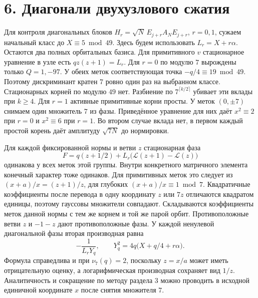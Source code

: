 \documentclass[11pt,a4paper]{article}
\newcommand{\sect}[1]{\section*{\sffamily\color{ink}#1}}
\begin{document}
\newpage
\sect{6. Диагонали двухузлового сжатия}
Для контроля диагональных блоков \(H_r=\sqrt N\,E_{j+r}A_NE_{j+r}\), \(r=0,1\), сужаем начальный класс до \(X\equiv5\bmod49\). Здесь будем использовать \(L_r=X+r\alpha\). Остаются два полных орбитальных базиса. Для примитивного \(v\) стационарное уравнение в узле есть \(qz(z+1)=L_r\). Для \(r=0\) по модулю \(7\) вырождены только \(Q=1,-97\). У обеих меток соответствующая точка \(-q/4\equiv19\bmod49\). Поэтому дискриминант кратен \(7\) ровно один раз на выбранном классе. Стационарных корней по модулю \(49\) нет. Разбиение по \(7^{\lceil k/2\rceil}\) убивает эти вклады при \(k\ge4\). Для \(r=1\) активные примитивные корни просты. У меток \((0,\pm7)\) снимаем один множитель \(7\) из фазы. Приведённое уравнение для них даёт \(x^2\equiv2\) при \(r=0\) и \(x^2\equiv6\) при \(r=1\). Во втором случае вклада нет, в первом каждый простой корень даёт амплитуду \(\sqrt{7N}\) до нормировки.

Для каждой фиксированной нормы и ветви \(z\) стационарная фаза
\[
    F=q(z+1/2)+L_r\bigl(\mathcal L(z+1)-\mathcal L(z)\bigr)
\]
одинакова у всех меток этой группы. Внутри конкретного матричного элемента конечный характер тоже одинаков. Для примитивных меток это следует из \((x+a)/x=(z+1)/z\), для глубоких \((x+a)/x\equiv1\bmod7\). Квадратичные коэффициенты после перевода в одну координату \(z\) или \(7z\) отличаются квадратом единицы, поэтому гауссовы множители совпадают. Складываются коэффициенты меток данной нормы с тем же корнем и той же парой орбит. Противоположные ветви \(z\) и \(-1-z\) дают противоположные фазы. У каждой ненулевой диагональной фазы вторая производная равна
\[
    -\frac{1}{L_rY_q},\qquad Y_q^2=4q\bigl(X+q/4+r\alpha\bigr).
\]
Формула справедлива и при \(\nu_7(q)=2\), поскольку \(z=x/a\) может иметь отрицательную оценку, а логарифмическая производная сохраняет вид \(1/z\). Аналитичность и сокращение по методу раздела 3 можно проводить в исходной единичной координате \(x\) после снятия множителя \(7\).
\end{document}

